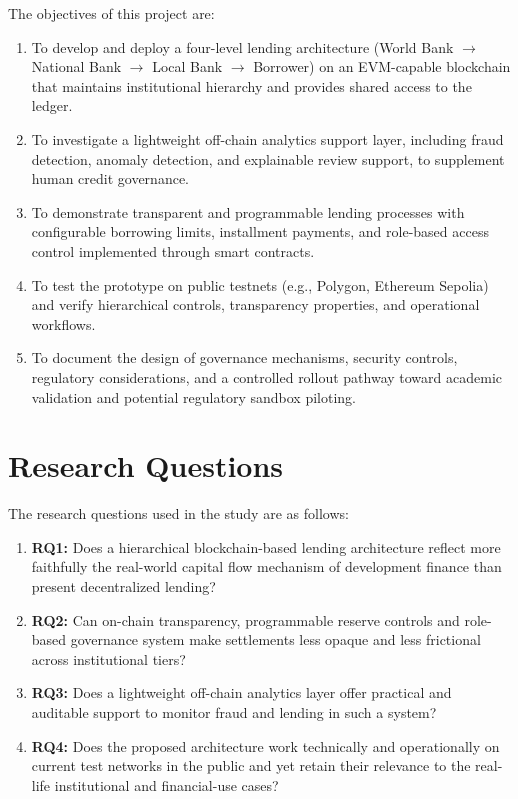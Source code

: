 \documentclass[12pt,a4paper]{report}
\begin{document}
The objectives of this project are:

\begin{enumerate}[noitemsep]
\item To develop and deploy a four-level lending architecture (World Bank $\to$ National Bank $\to$ Local Bank $\to$ Borrower) on an EVM-capable blockchain that maintains institutional hierarchy and provides shared access to the ledger.
\item To investigate a lightweight off-chain analytics support layer, including fraud detection, anomaly detection, and explainable review support, to supplement human credit governance.
\item To demonstrate transparent and programmable lending processes with configurable borrowing limits, installment payments, and role-based access control implemented through smart contracts.
\item To test the prototype on public testnets (e.g., Polygon, Ethereum Sepolia) and verify hierarchical controls, transparency properties, and operational workflows.
\item To document the design of governance mechanisms, security controls, regulatory considerations, and a controlled rollout pathway toward academic validation and potential regulatory sandbox piloting.
\end{enumerate}

\section{Research Questions}

The research questions used in the study are as follows:

\begin{enumerate}[noitemsep]
\item \textbf{RQ1:} Does a hierarchical blockchain-based lending architecture reflect more faithfully the real-world capital flow mechanism of development finance than present decentralized lending?
\item \textbf{RQ2:} Can on-chain transparency, programmable reserve controls and role-based governance system make settlements less opaque and less frictional across institutional tiers?
\item \textbf{RQ3:} Does a lightweight off-chain analytics layer offer practical and auditable support to monitor fraud and lending in such a system?
\item \textbf{RQ4:} Does the proposed architecture work technically and operationally on current test networks in the public and yet retain their relevance to the real-life institutional and financial-use cases?
\end{enumerate}
\end{document}
